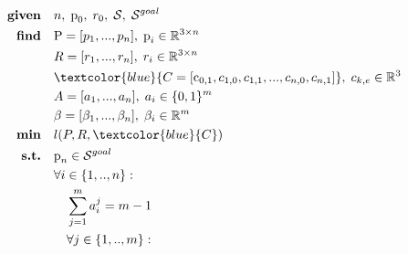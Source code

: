 \begin{align}
    \textrm{\textbf{given}} %
                            \quad & n, \; \mbox{p}_0, \; r_0, \; \mathcal{S}, \; \mathcal{S}^{goal} \nonumber\\
    \textrm{\textbf{find}}  \quad & \mbox{P}=[p_1,...,p_n], \; \mbox{p}_i \in \mathbb{R}^{3 \times n} \nonumber\\
                            \quad & R=[r_1,...,r_n], \; r_i \in \mathbb{R}^{3 \times n} \nonumber\\
                            \quad & \textcolor{blue}{C=[\mbox{c}_{0,1},c_{1,0},c_{1,1},...,c_{n,0},c_{n,1}]}, \; c_{k,e} \in \mathbb{R}^3 \nonumber\\
                            \quad & A=[a_1,...,a_n], \; a_i \in \{0,1\}^{m} \nonumber\\
                            \quad & \beta=[\beta_1,...,\beta_n], \; \beta_i \in \mathbb{R}^{m} \nonumber\\
    \textrm{\textbf{min}}  \quad & l(P,R,\textcolor{blue}{C}) \nonumber\\
    \textrm{\textbf{s.t.}}  \quad & \mbox{p}_n \in \mathcal{S}^{goal} \nonumber\\
                            \quad & \forall i \in \{1,..,n\} : \nonumber\\
                                \quad & \quad \sum_{j=1}^{m} a_i^j = m-1  \nonumber\\
                                \quad & \quad \forall j \in \{1,..,m\} : \nonumber\\

\end{align}

